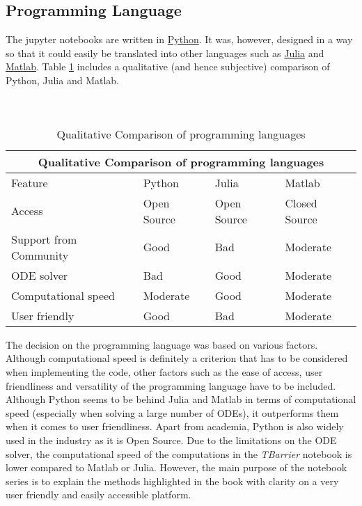 \documentclass{article}
\begin{document}
\subsection{Programming Language}
The jupyter notebooks are written in \href{https://www.python.org}{Python}. It was, however, designed in a way so that it could easily be translated into other languages such as \href{https://julialang.org}{Julia} and \href{https://www.mathworks.com/products/matlab.html}{Matlab}. Table \ref{tab: language} includes a qualitative (and hence subjective) comparison of Python, Julia and Matlab.
\\ \\ \\
\begin{table}
\centering
\begin{tabular}{ |p{3cm}||p{2cm}|p{2cm}|p{2cm}|  }
 \hline
 \multicolumn{4}{|c|}{Qualitative Comparison of programming languages} \\
 \hline
Feature & Python  & Julia & Matlab \\
 \hline
Access   &  \cellcolor{green!25} Open Source    & \cellcolor{green!25} Open Source &   \cellcolor{red!25} Closed Source\\
 \hline
Support from Community &  \cellcolor{green!25} Good  & \cellcolor{red!25} Bad &   \cellcolor{yellow!25} Moderate \\
 \hline
ODE solver &  \cellcolor{red!25} Bad  & \cellcolor{green!25} Good &   \cellcolor{yellow!25} Moderate \\
 \hline
 Computational speed &  \cellcolor{yellow!25} Moderate  & \cellcolor{green!25} Good &   \cellcolor{yellow!25} Moderate \\
 \hline
  User friendly &  \cellcolor{green!25} Good  & \cellcolor{red!25} Bad &   \cellcolor{yellow!25} Moderate \\
 \hline
\end{tabular}
\caption{Qualitative Comparison of programming languages}
\label{tab: language}
\end{table}
The decision on the programming language was based on various factors. Although computational speed is definitely a criterion that has to be considered when implementing the code, other factors such as the ease of access, user friendliness and versatility of the programming language have to be included. Although Python seems to be behind Julia  and Matlab in terms of computational speed (especially when solving a large number of ODEs), it outperforms them when it comes to user friendliness. Apart from academia, Python is also widely used in the industry as it is Open Source. Due to the limitations on the ODE solver, the computational speed of the computations in the \textit{TBarrier} notebook is lower compared to Matlab or Julia. However, the main purpose of the notebook series is to explain the methods highlighted in the book with clarity on a very user friendly and easily accessible platform.
\end{document}
